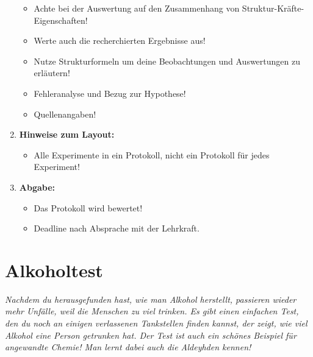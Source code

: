 \documentclass{scrartcl}  %
\begin{document}
\begin{enumerate}
\begin{itemize}
		                \item Achte bei der Auswertung auf den Zusammenhang von Struktur-Kräfte-Eigenschaften!
		                \item Werte auch die recherchierten Ergebnisse aus!
		                \item Nutze Strukturformeln um deine Beobachtungen und Auswertungen zu erläutern!
		                \item Fehleranalyse und Bezug zur Hypothese!
		                \item Quellenangaben!
	                \end{itemize}
	            \item \textbf{Hinweise zum Layout:}
	                \begin{itemize}
		                \item Alle Experimente in ein Protokoll, nicht ein Protokoll für jedes Experiment!
	                \end{itemize}
	            \item \textbf{Abgabe:}
	            	\begin{itemize}
		            	\item Das Protokoll wird bewertet!
	                	\item Deadline nach Absprache mit der Lehrkraft.
					\end{itemize}
				\end{enumerate}
				
\newpage
		\section{Alkoholtest}
		
			\textit{Nachdem du herausgefunden hast, wie man Alkohol herstellt, passieren wieder mehr Unfälle, weil die Menschen zu viel trinken. Es gibt einen einfachen Test, den du noch an einigen verlassenen Tankstellen finden kannst, der zeigt, wie viel Alkohol eine Person getrunken hat. Der Test ist auch ein schönes Beispiel für angewandte Chemie! Man lernt dabei auch die Aldeyhden kennen!} \newline
				
\end{document}
